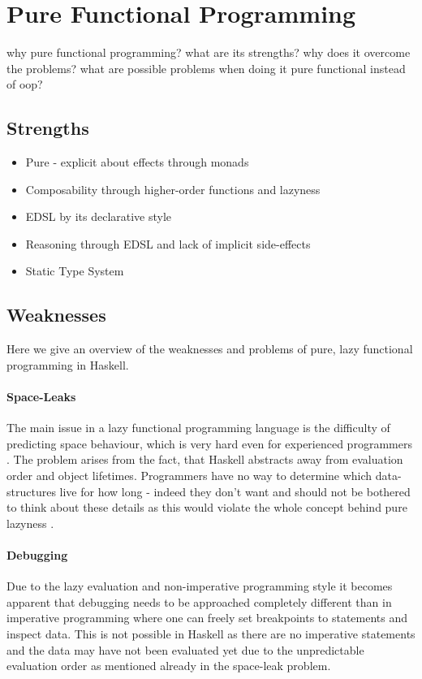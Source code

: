 \section{Pure Functional Programming}
why pure functional programming? what are its strengths? why does it overcome the problems? what are possible problems when doing it pure functional instead of oop?

\subsection{Strengths}
\begin{itemize}
	\item Pure - explicit about effects through monads
	\item Composability through higher-order functions and lazyness
	\item EDSL by its declarative style
	\item Reasoning through EDSL and lack of implicit side-effects 
	\item Static Type System
\end{itemize}

\subsection{Weaknesses}
Here we give an overview of the weaknesses and problems of pure, lazy functional programming in Haskell.

\paragraph{Space-Leaks}
The main issue in a lazy functional programming language is the difficulty of predicting space behaviour, which is very hard even for experienced programmers \cite{hudak_history_2007}. The problem arises from the fact, that Haskell abstracts away from evaluation order and object lifetimes. Programmers have no way to determine which data-structures live for how long - indeed they don't want and should not be bothered to think about these details as this would violate the whole concept behind pure lazyness \cite{hudak_history_2007}.

\paragraph{Debugging}
Due to the lazy evaluation and non-imperative programming style it becomes apparent that debugging needs to be approached completely different than in imperative programming where one can freely set breakpoints to statements and inspect data. This is not possible in Haskell as there are no imperative statements and the data may have not been evaluated yet due to the unpredictable evaluation order as mentioned already in the space-leak problem.

